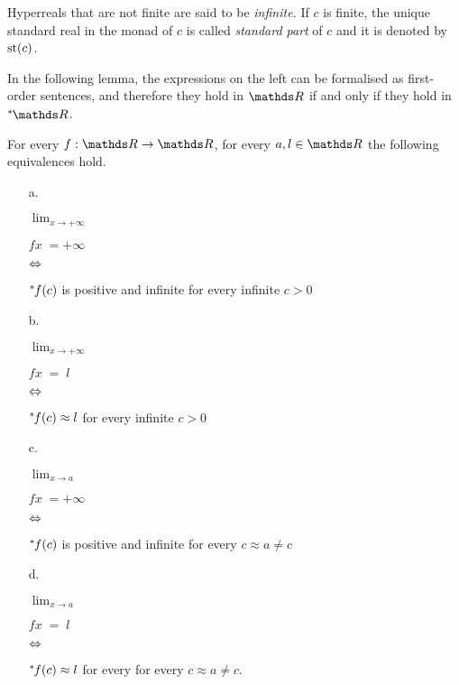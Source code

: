 Hyperreals that are not finite are said to be \emph{infinite.}
If $c$ is finite, the unique standard real in the monad of $c$ is called \emph{standard part\/} of $c$ and it is denoted by \emph{${\rm st}(c)$.}

In the following lemma, the expressions on the left can be formalised as first-order sentences, and therefore they hold in $\RR$ if and only if they hold in $\nsR$.

\begin{proposition}\label{prop_fattolimitinonstandard}
For every $f:\RR\to\RR$, for every $a, l\in\RR$ the following equivalences hold.\nobreak
\begin{itemize}
\item[a.]\parbox{7ex}{\hfil$\displaystyle\lim_{x\to+\infty}$}
\parbox{10ex}{$fx\;=+\infty$}
\parbox{5ex}{\hfil$\Leftrightarrow$}
${}^*\kern-.2ex f(c)$ is positive and infinite for every infinite $c>0$

\item[b.]\parbox{7ex}{\hfil$\displaystyle\lim_{x\to+\infty}$}
\parbox{10ex}{$fx\;=\;l$}
\parbox{6ex}{\hfil$\Leftrightarrow$}
${}^*\kern-.2ex f(c)\approx l$ for every infinite $c>0$

\item[c.]\parbox{7ex}{\hfil$\displaystyle\lim_{x\to a}$}
\parbox{10ex}{$fx\;=+\infty$}
\parbox{5ex}{\hfil$\Leftrightarrow$}
${}^*\kern-.2ex f(c)$ is positive and infinite for every $c\approx a\neq c$

\item[d.]\parbox{7ex}{\hfil$\displaystyle\lim_{x\to a}$}
\parbox{10ex}{$fx\;=\;l$}
\parbox{5ex}{\hfil$\Leftrightarrow$}
${}^*\kern-.2ex f(c)\approx l$ for every for every $c\approx a\neq c$.
\end{itemize}
\end{proposition}

